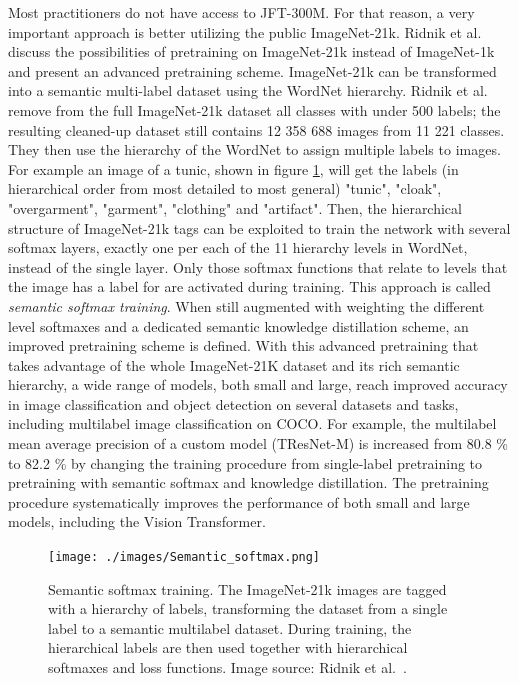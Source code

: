 \documentclass[english,twoside,openright]{HYgraduMLDS}
\begin{document}
Most practitioners do not have access to JFT-300M. For that reason, a very important approach is better utilizing the public ImageNet-21k. Ridnik et al.~\cite{ImageNet21k_Pretraining} discuss the possibilities of pretraining on ImageNet-21k instead of ImageNet-1k and present an advanced pretraining scheme. ImageNet-21k can be transformed into a semantic multi-label dataset using the WordNet hierarchy. Ridnik et al. remove from the full ImageNet-21k dataset all classes with under 500 labels; the resulting cleaned-up dataset still contains 12 358 688 images from 11 221 classes. They then use the hierarchy of the WordNet to assign multiple labels to images. For example an image of a tunic, shown in figure \ref{fig:Semantic_softmax}, will get the labels (in hierarchical order from most detailed to most general) "tunic", "cloak", "overgarment", "garment", "clothing" and "artifact". Then, the hierarchical structure of ImageNet-21k tags can be exploited to train the network with several softmax layers, exactly one per each of the 11 hierarchy levels in WordNet, instead of the single layer. Only those softmax functions that relate to levels that the image has a label for are activated during training. This approach is called \textit{semantic softmax training}. When still augmented with weighting the different level softmaxes and a dedicated semantic knowledge distillation scheme, an improved pretraining scheme is defined. With this advanced pretraining that takes advantage of the whole ImageNet-21K dataset and its rich semantic hierarchy, a wide range of models, both small and large, reach improved accuracy in image classification and object detection on several datasets and tasks, including multilabel image classification on COCO. For example, the multilabel mean average precision of a custom model (TResNet-M) is increased from 80.8 \% to 82.2 \% by changing the training procedure from single-label pretraining to pretraining with semantic softmax and knowledge distillation. The pretraining procedure systematically improves the performance of both small and large models, including the Vision Transformer. 

\begin{figure}[h] 
\centering
\texttt{[image: ./images/Semantic\_softmax.png]}
\caption{Semantic softmax training. The ImageNet-21k images are tagged with a hierarchy of labels, transforming the dataset from a single label to a semantic multilabel dataset. During training, the hierarchical labels are then used together with hierarchical softmaxes and loss functions. Image source: Ridnik et al.~\cite{ImageNet21k_Pretraining}.}
\label{fig:Semantic_softmax} 
\end{figure}
\end{document}
